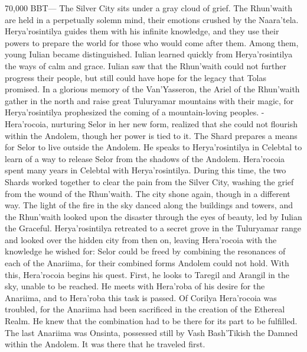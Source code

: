 \documentclass[smalldemyvopaper,11pt,twoside,onecolumn,openright,extrafontsizes]{memoir}
\begin{document}
70,000 BBT— The Silver City sits under a gray cloud of grief. The Rhun’waith are held in a perpetually solemn mind, their emotions crushed by the Naara’tela. Herya’rosintilya guides them with his infinite knowledge, and they use their powers to prepare the world for those who would come after them. Among them, young Iulian became distinguished. Iulian learned quickly from Herya’rosintilya the ways of calm and grace. Iulian saw that the Rhun’waith could not further progress their people, but still could have hope for the legacy that Tolas promised. In a glorious memory of the Van’Yasseron, the Ariel of the Rhun’waith gather in the north and raise great Tuluryamar mountains with their magic, for Herya’rosintilya prophesized the coming of a mountain-loving peoples.
-Hera’rocoia, nurturing Selor in her new form, realized that she could not flourish within the Andolem, though her power is tied to it. The Shard prepares a means for Selor to live outside the Andolem. He speaks to Herya’rosintilya in Celebtal to learn of a way to release Selor from the shadows of the Andolem. Hera’rocoia spent many years in Celebtal with Herya’rosintilya. During this time, the two Shards worked together to clear the pain from the Silver City, washing the grief from the wound of the Rhun’waith. The city shone again, though in a different way. The light of the fire in the sky danced along the buildings and towers, and the Rhun’waith looked upon the disaster through the eyes of beauty, led by Iulian the Graceful. Herya’rosintilya retreated to a secret grove in the Tuluryamar range and looked over the hidden city from then on, leaving Hera’rocoia with the knowledge he wished for: Selor could be freed by combining the resonances of each of the Anariima, for their combined forms Andolem could not hold. With this, Hera’rocoia begins his quest. First, he looks to Taregil and Arangil in the sky, unable to be reached. He meets with Hera’roba of his desire for the Anariima, and to Hera’roba this task is passed. Of Corilya Hera’rocoia was troubled, for the Anariima had been sacrificed in the creation of the Ethereal Realm. He knew that the combination had to be there for its part to be fulfilled. The last Anariima was Onsinta, possessed still by Vash Bash’Tikish the Damned within the Andolem. It was there that he traveled first.
\end{document}
